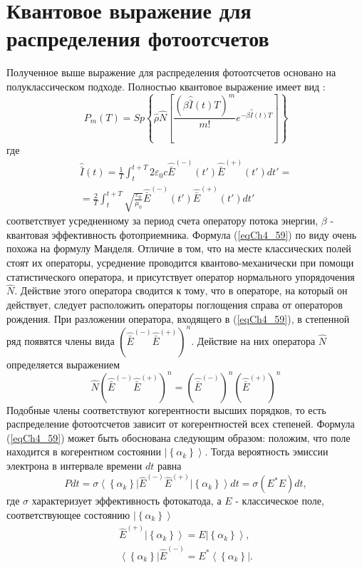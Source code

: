 \section{Квантовое выражение для распределения фотоотсчетов}
Полученное выше выражение для распределения фотоотсчетов основано на
полуклассическом подходе. Полностью квантовое выражение имеет
вид \cite{bLoudon1976}: 
\begin{equation}
P_m\left(T\right) = Sp \left\{
\hat{\rho}\hat{N}
\left[
\frac{\left(\beta \hat{\bar{I}}\left(t\right) T\right)^m}{m!}
e^{- \beta \hat{\bar{I}}\left(t\right) T}
\right]
\right\} 
\label{eqCh4_59}
\end{equation}
где
\begin{eqnarray}
\hat{\bar{I}}\left(t\right) = \frac{1}{T}\int_t^{t + T}2
\varepsilon_0 c \hat{\bar{E}}^{(-)}\left(t'\right)
\hat{\bar{E}}^{(+)}\left(t'\right)dt' =
\nonumber \\
= \frac{2}{T}\int_t^{t + T}
\sqrt{\frac{\varepsilon_0}{\mu_0}} \hat{\bar{E}}^{(-)}\left(t'\right)
\hat{\bar{E}}^{(+)}\left(t'\right)dt'
\nonumber
\end{eqnarray}
соответствует усредненному за период счета оператору потока энергии,
$\beta$ - квантовая эффективность фотоприемника. Формула
(\ref{eqCh4_59}) по виду очень 
похожа на формулу Манделя. Отличие в том, что на месте классических
полей стоят их операторы, усреднение проводится квантово-механически
при помощи статистического оператора, и присутствует оператор
нормального упорядочения $\hat{N}$.  Действие этого оператора сводится
к тому, что в операторе, на который он действует, следует расположить 
операторы поглощения справа от операторов рождения. При разложении
оператора, входящего в (\ref{eqCh4_59}), в степенной ряд появятся
члены вида  $\left(\hat{\bar{E}}^{(-)}\hat{\bar{E}}^{(+)}\right)^n$.  
Действие на них оператора $\hat{N}$  определяется выражением 
\[
\hat{N}\left(\hat{\bar{E}}^{(-)}\hat{\bar{E}}^{(+)}\right)^n = 
\left(\hat{\bar{E}}^{(-)}\right)^n\left(\hat{\bar{E}}^{(+)}\right)^n
\]
Подобные члены соответствуют когерентности высших порядков, то есть
распределение фотоотсчетов зависит от когерентностей всех
степеней. Формула (\ref{eqCh4_59}) может быть обоснована следующим образом:
положим, что поле находится в когерентном состоянии
$\left|\left\{\alpha_k\right\}\right>$.  Тогда 
вероятность эмиссии электрона в интервале времени $dt$ равна 
\[
Pdt = \sigma
\left<\left\{\alpha_k\right\}\right|
\hat{E}^{(-)} \hat{E}^{(+)}
\left|\left\{\alpha_k\right\}\right> dt = 
\sigma \left(E^{*} E\right)dt,
\]
где $\sigma$ характеризует эффективность фотокатода, а $E$ -
классическое поле, соответствующее состоянию $\left|\left\{\alpha_k\right\}\right>$
\begin{eqnarray}
\hat{E}^{(+)} \left|\left\{\alpha_k\right\}\right> = E \left|\left\{\alpha_k\right\}\right>,
\nonumber \\
\left<\left\{\alpha_k\right\}\right|\hat{E}^{(-)} = E^{*} \left<\left\{\alpha_k\right\}\right|.
\nonumber
\end{eqnarray}

